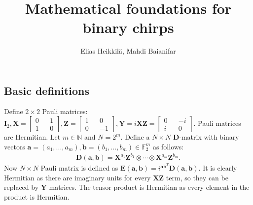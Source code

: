 \documentclass{article}
\title{Mathematical foundations for binary chirps}
\author{Elias Heikkilä, Mahdi Baianifar}
\date{}
\begin{document}
	\maketitle


\subsection*{Basic definitions}
Define $2 \times 2$ Pauli matrices: $\mathbf{I}_2, \mathbf{X} = \begin{bmatrix} 0 && 1 \\ 1 && 0 \end{bmatrix}, \mathbf{Z} = \begin{bmatrix} 1 && 0 \\ 0 && -1 \end{bmatrix}, \mathbf{Y} = i\mathbf{X}\mathbf{Z} = \begin{bmatrix} 0 && -i \\ i && 0 \end{bmatrix}$. Pauli matrices are Hermitian.
Let $m \in \mathbb{N}$ and $N = 2^m$. Define a $N \times N$ $\mathbf{D}$-matrix with binary vectors $\mathbf{a} = (a_1, ..., a_m), \mathbf{b} = (b_1,..., b_m) \in \mathbb{F}_2^m$ as follows:
\begin{align*}
	\mathbf{D}(\mathbf{a}, \mathbf{b}) = \mathbf{X}^{a_1}\mathbf{Z}^{b_1} \otimes \cdots \otimes \mathbf{X}^{a_m}\mathbf{Z}^{b_m}.
\end{align*}
Now $N \times N$ Pauli matrix is defined as $\mathbf{E}(\mathbf{a}, \mathbf{b}) = i^{\mathbf{a}\mathbf{b}^T}\mathbf{D}(\mathbf{a}, \mathbf{b})$. It is clearly Hermitian as there are imaginary units for every $\mathbf{XZ}$ term, so they can be replaced by $\mathbf{Y}$ matrices. The tensor product is Hermitian as every element in the product is Hermitian.
\end{document}
